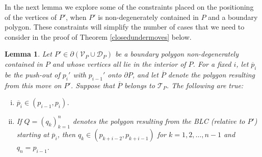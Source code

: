 \documentclass[11pt]{amsart}
\newtheorem{lemma}[theorem]{Lemma}
\theoremstyle{remark}
\numberwithin{equation}{section}
\newcommand{\D}{\mathcal{D}}
\newcommand{\TT}{\mathcal{T}}
\newcommand{\V}{\mathcal{V}}
\begin{document}
In the next lemma we explore some of the constraints placed on the positioning  of the vertices of $P'$, when 
$P'$  is non-degenerately contained in $P$ and a boundary polygon. These constraints will simplify the number
of cases that we need to consider in  the proof of Theorem \ref{closedundermoves} below.



\begin{lemma}\label{boundaryP'}
Let $P'\in \partial(\V_P\cup\D_P)$ be a boundary polygon non-degenerately contained in $P$ and  whose vertices all lie in the interior of $P$. For a fixed $i$, let $\overline p_i$ be the push-out of $p_i'$ with $p_{i-1}'$ onto $\partial P$, and let $\overline P$ denote the polygon resulting from this move on $P'$. 
Suppose that $\overline P$ belongs to $\TT_P$. The following are true:
\begin{enumerate}[(i)]
\item
 $\overline p_i\in (p_{i-1},p_i)$.
 
 \item
If $Q=(q_k)_{k=1}^n$ denotes the polygon resulting from the  BLC (relative to $P'$) starting at $\overline p_i$, then
$q_{k}\in (p_{k+i-2},p_{k+i-1})$ for $k=1,2,\ldots,n-1$ and $q_n=p_{i-1}$.
\end{enumerate}
\end{lemma}
\end{document}

